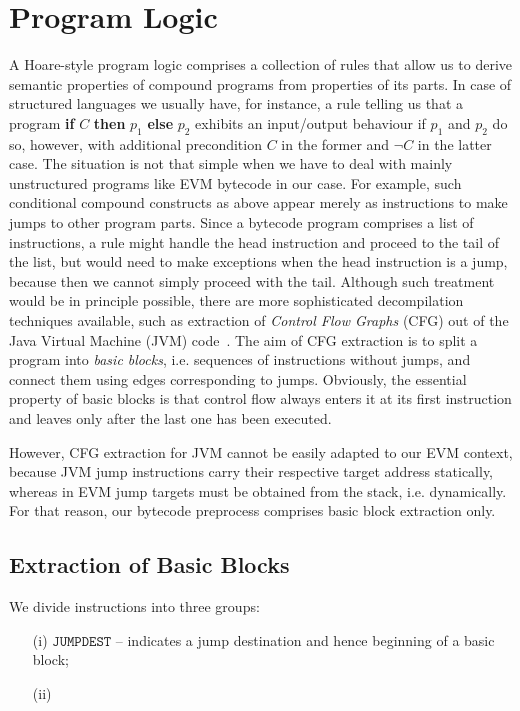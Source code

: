 \documentclass[sigplan,10pt,review]{acmart}\settopmatter{printfolios=true,printccs=false,printacmref=false}
\newcommand{\instr}[1]{\mathtt{#1}}
\begin{document}
\section{Program Logic}
\label{sec:logic}
A Hoare-style program logic comprises a collection of rules that allow us to derive semantic properties 
of compound programs from properties of its parts. In case of structured languages 
we usually have, for instance, a rule telling us that a program \textbf{if} $C$ \textbf{then} $p_1$ \textbf{else} $p_2$
exhibits an input/output behaviour if $p_1$ and $p_2$ do so, however, with additional precondition $C$ in the former
and $\neg C$ in the latter case. The situation is not that simple when we have to deal with mainly
unstructured programs like EVM bytecode in our case. For example, such conditional compound constructs as above
appear merely as instructions to make jumps to other program parts. Since a bytecode program comprises
a list of instructions, a rule might handle the head instruction and proceed to the tail of 
the list, but would need to make exceptions when the head instruction is a jump, because then
we cannot simply proceed with the tail. Although such treatment would be in principle possible,
there are more sophisticated decompilation techniques available, such as extraction of 
\emph{Control Flow Graphs} (CFG) out of the Java Virtual Machine (JVM) code~\cite{zhao99}.
The aim of CFG extraction is to split a program into \emph{basic blocks}, i.e. sequences of
instructions without jumps, and connect them
using edges corresponding to jumps. Obviously, the essential property of basic blocks is that
control flow always enters it at its first instruction and leaves only after the last one
has been executed.

However, CFG extraction for JVM cannot be easily adapted to our EVM context, because JVM jump
instructions carry their respective target address statically, whereas in EVM jump targets
must be obtained from the stack, i.e. dynamically. For that reason, our bytecode preprocess
comprises basic block extraction only.  
%       
\subsection{Extraction of Basic Blocks}
We divide instructions into three groups:
\begin{itemize}
\item[(i)] $\instr{JUMPDEST}$ -- indicates a jump destination and hence beginning of a
                                 basic block;
\item[(ii)] 
\end{itemize} 
                                  
\end{document}
